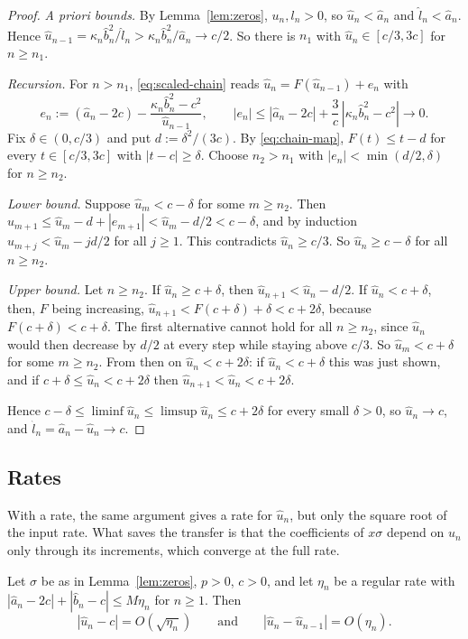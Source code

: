 \begin{proof}
\emph{A priori bounds.} By Lemma~\ref{lem:zeros}, $u_n,l_n>0$, so $\hat u_n<\hat a_n$ and $\hat l_n<\hat a_n$. Hence
$\hat u_{n-1}=\kappa_n\hat b_n^2/\hat l_n>\kappa_n\hat b_n^2/\hat a_n\to c/2$. So there is $n_1$ with
$\hat u_n\in[c/3,3c]$ for $n\ge n_1$.

\emph{Recursion.} For $n>n_1$, \eqref{eq:scaled-chain} reads $\hat u_n=F(\hat u_{n-1})+e_n$ with
\[
  e_n:=(\hat a_n-2c)-\frac{\kappa_n\hat b_n^2-c^2}{\hat u_{n-1}},\qquad
  |e_n|\le|\hat a_n-2c|+\frac3c\,|\kappa_n\hat b_n^2-c^2|\longrightarrow0 .
\]
Fix $\delta\in(0,c/3)$ and put $d:=\delta^2/(3c)$. By \eqref{eq:chain-map}, $F(t)\le t-d$ for every
$t\in[c/3,3c]$ with $|t-c|\ge\delta$. Choose $n_2>n_1$ with $|e_n|<\min(d/2,\delta)$ for $n\ge n_2$.

\emph{Lower bound.} Suppose $\hat u_m<c-\delta$ for some $m\ge n_2$. Then
$\hat u_{m+1}\le\hat u_m-d+|e_{m+1}|<\hat u_m-d/2<c-\delta$, and by induction $\hat u_{m+j}<\hat u_m-jd/2$ for all
$j\ge1$. This contradicts $\hat u_n\ge c/3$. So $\hat u_n\ge c-\delta$ for all $n\ge n_2$.

\emph{Upper bound.} Let $n\ge n_2$. If $\hat u_n\ge c+\delta$, then $\hat u_{n+1}<\hat u_n-d/2$. If $\hat u_n<c+\delta$,
then, $F$ being increasing, $\hat u_{n+1}<F(c+\delta)+\delta<c+2\delta$, because $F(c+\delta)<c+\delta$. The first
alternative cannot hold for all $n\ge n_2$, since $\hat u_n$ would then decrease by $d/2$ at every step while staying
above $c/3$. So $\hat u_m<c+\delta$ for some $m\ge n_2$. From then on $\hat u_n<c+2\delta$: if $\hat u_n<c+\delta$ this
was just shown, and if $c+\delta\le\hat u_n<c+2\delta$ then $\hat u_{n+1}<\hat u_n<c+2\delta$.

Hence $c-\delta\le\liminf\hat u_n\le\limsup\hat u_n\le c+2\delta$ for every small $\delta>0$, so $\hat u_n\to c$, and
$\hat l_n=\hat a_n-\hat u_n\to c$.
\end{proof}

\subsection{Rates}

With a rate, the same argument gives a rate for $\hat u_n$, but only the square root of the input rate. What saves the
transfer is that the coefficients of $x\sigma$ depend on $\hat u_n$ only through its increments, which converge at the
full rate.

\begin{lemma}\label{lem:chain-rate}
Let $\sigma$ be as in Lemma~\ref{lem:zeros}, $p>0$, $c>0$, and let $\eta_n$ be a regular rate with
$|\hat a_n-2c|+|\hat b_n-c|\le M\eta_n$ for $n\ge1$. Then
\[
  |\hat u_n-c|=O(\sqrt{\eta_n})\qquad\text{and}\qquad |\hat u_n-\hat u_{n-1}|=O(\eta_n).
\]
\end{lemma}

